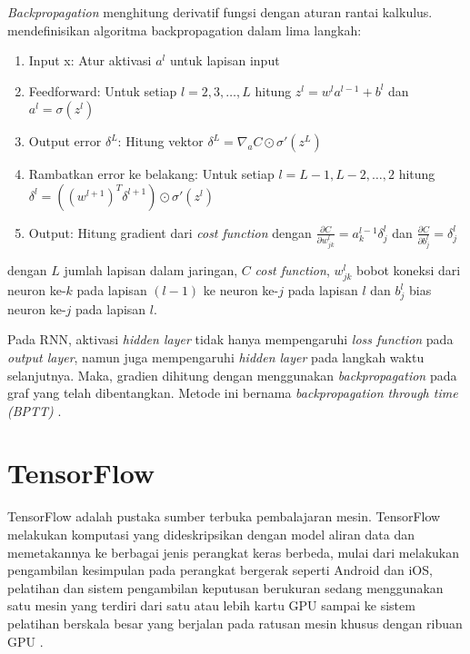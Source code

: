 \textit{Backpropagation} menghitung derivatif fungsi dengan aturan rantai kalkulus. \citet{nielsen-2015} mendefinisikan algoritma backpropagation dalam lima langkah:
\begin{enumerate}
    \item Input x: Atur aktivasi $a^{l}$ untuk lapisan input
    \item Feedforward: Untuk setiap $l = 2, 3, \ldots, L$ hitung $z^{l} = w^{l} a^{l-1} + b^{l}$ dan $a^{l} = \sigma (z^{l})$
    \item Output error $\delta^{L}$: Hitung vektor $\delta^{L} = \nabla_{a} C \odot \sigma ' (z^{L})$
    \item Rambatkan error ke belakang: Untuk setiap $l = L-1, L-2, \ldots, 2$ hitung $\delta^{l} = ({(w^{l+1})}^{T} \delta^{l+1}) \odot \sigma' (z^{l})$
    \item Output: Hitung gradient dari \textit{cost function} dengan $\frac{\partial C}{\partial w_{jk}^{l}} = a_{k}^{l-1} \delta_{j}^{l}$ dan $\frac{\partial C}{\partial b_{j}^{l}} = \delta_{j}^{l}$
\end{enumerate}

\noindent
dengan $L$ jumlah lapisan dalam jaringan, $C$ \textit{cost function}, $w_{jk}^{l}$ bobot koneksi dari neuron ke-$k$ pada lapisan $(l-1)$ ke neuron ke-$j$ pada lapisan $l$ dan $b_{j}^{l}$ bias neuron ke-$j$ pada lapisan $l$.

Pada RNN, aktivasi \textit{hidden layer} tidak hanya mempengaruhi \textit{loss function} pada \textit{output layer}, namun juga mempengaruhi \textit{hidden layer} pada langkah waktu selanjutnya. Maka, gradien dihitung dengan menggunakan \textit{backpropagation} pada graf yang telah dibentangkan. Metode ini bernama \textit{backpropagation through time (BPTT)} \citep{graves-2012}.


\section{TensorFlow}
TensorFlow adalah pustaka sumber terbuka pembalajaran mesin. TensorFlow melakukan komputasi yang dideskripsikan dengan model aliran data dan memetakannya ke berbagai jenis perangkat keras berbeda, mulai dari melakukan pengambilan kesimpulan pada perangkat bergerak seperti Android dan iOS, pelatihan dan sistem pengambilan keputusan berukuran sedang menggunakan satu mesin yang terdiri dari satu atau lebih kartu GPU sampai ke sistem pelatihan berskala besar yang berjalan pada ratusan mesin khusus dengan ribuan GPU \citep{abadi-2015}.

